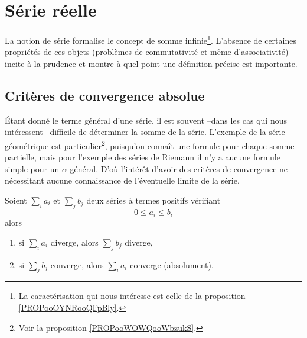 \section{Série réelle}
\label{secseries}

La notion de série formalise le concept de somme infinie\footnote{La caractérisation qui nous intéresse est celle de la proposition \ref{PROPooOYNRooQFpBly}.}. L'absence de certaines propriétés de ces objets (problèmes de commutativité et même d'associativité) incite à la prudence et montre à quel point une définition précise est importante.


\subsection{Critères de convergence absolue}

Étant donné le terme général d'une série, il est souvent --dans les cas qui nous intéressent-- difficile de déterminer la somme de la série. L'exemple de la série géométrique est particulier\footnote{Voir la proposition \ref{PROPooWOWQooWbzukS}.}, puisqu'on connaît une formule pour chaque somme partielle, mais pour l'exemple des séries de Riemann il n'y a aucune formule simple pour un \( \alpha\) général. D'où l'intérêt d'avoir des critères de convergence ne nécessitant aucune connaissance de l'éventuelle limite de la série.

\begin{lemma}   \label{LemgHWyfG}
	Soient \( \sum_i a_i\) et \( \sum_j
	b_j\) deux séries à termes positifs vérifiant
	\begin{equation*}
		0 \leq a_i \leq b_i
	\end{equation*}
	alors
	\begin{enumerate}
		\item si \( \sum_i a_i\) diverge, alors \( \sum_j b_j\) diverge,
		\item \label{ITEMooBBWTooYDHnuH}
		      si \( \sum_j b_j\) converge, alors \( \sum_i a_i\) converge
		      (absolument).
	\end{enumerate}
\end{lemma}

